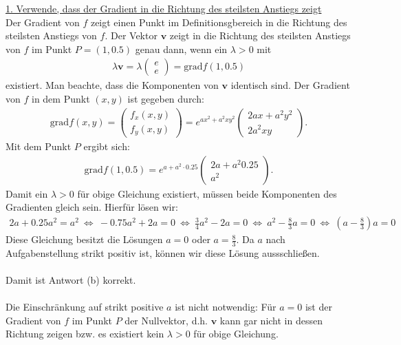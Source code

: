 \underline{1. Verwende, dass der Gradient in die Richtung des steilsten Anstiegs zeigt}\\
Der Gradient von $f$ zeigt einen Punkt im Definitionsgbereich in die Richtung des steilsten Anstiegs von $f$.
Der Vektor $\mathbf{v}$ zeigt in die Richtung des steilsten Anstiegs von $f$ im Punkt $P = (1,0.5)$ genau dann, wenn ein $\lambda > 0 $ mit 
\begin{align*}
	\lambda\mathbf{v} 
	= \lambda 
	\begin{pmatrix}
		e \\ e
	\end{pmatrix}
	= \mathrm{grad} f(1,0.5)
\end{align*}
existiert. Man beachte, dass die Komponenten von $\mathbf{v}$ identisch sind. Der Gradient von $f$ in dem Punkt $(x,y)$ ist gegeben durch:
\begin{align*}
	\mathrm{grad} f(x,y)
	=
	\begin{pmatrix}
		f_x(x,y)\\
		f_y(x,y)
	\end{pmatrix}
	=
	e^{ax^2 +a^2 xy^2}
	\begin{pmatrix}
		2a x + a^2 y^2 \\
		2 a^2 xy
	\end{pmatrix}.
\end{align*}
Mit dem Punkt $P$ ergibt sich:
\begin{align*}
	\mathrm{grad} f(1,0.5)
	=
	e^{a+a^2\cdot 0.25}
	\begin{pmatrix}
		2a+a^2 0.25\\
		a^2
	\end{pmatrix}.
\end{align*}
Damit ein $\lambda > 0$ für obige Gleichung existiert, müssen beide Komponenten des Gradienten gleich sein. Hierfür lösen wir:
\begin{align*}
	2a + 0.25 a^2 = a^2 
	\ \Leftrightarrow \
	-0.75a^2 + 2a = 0
	\ \Leftrightarrow \
	\frac{3}{4} a^2 -2a = 0
	\ \Leftrightarrow \
	a^2 - \frac{8}{3} a = 0
	\ \Leftrightarrow \
	\left(a - \frac{8}{3}\right) a = 0
\end{align*}
Diese Gleichung besitzt die Lösungen $a= 0$ oder $a = \frac{8}{3}$. 
Da $a$ nach Aufgabenstellung strikt positiv ist, können wir diese Lösung aussschließen.\\
\\
Damit ist Antwort (b) korrekt.\\
\\
Die Einschränkung auf strikt positive $a$ ist nicht notwendig:
Für $a = 0$ ist der Gradient von $f$ im Punkt $P$ der Nullvektor, d.h. $\mathbf{v} $ kann gar nicht in dessen Richtung zeigen bzw. es existiert kein $\lambda > 0$ für obige Gleichung.


